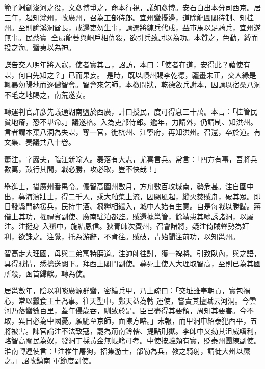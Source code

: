 \begin{pinyinscope}
 範子淵創浚河之役，文彥博爭之，命本行視，議如彥博。安石白出本分司西京。居三年，起知滁州，改廣州，召為工部侍郎。宜州蠻擾邊，道除龍圖閣待制、知桂州。至則諭溪洞酋長，戒邊吏勿生事，請選將練兵代戍，益市馬以足騎兵，宜州遂無事。民蔡寶□全扇龍蕃與峒戶相仇殺，欲引兵致討以為功。本質之，色動，縛而投之海。蠻夷以為神。



 諜告交人明年將入寇，使者實其言，詔訪，本曰：「使者在道，安得此？藉使有謀，何自先知之？」已而果妄。
 是時，既以順州賜李乾德，疆畫未正，交人緣是輒暴勿陽地而逐儂智會。智會來乞師，本檄問狀，乾德斂兵謝本，因請以宿桑八洞不毛之地賜之，南荒遂安。



 轉運判官許彥先議通湖南鹽於西廣，計口授民，度可得息三十萬。本言：「桂管民貧地瘠，恐不堪命。」議遂格。入為吏部侍郎。逾年，力請外，仍請制、知洪州。言者謂本棄八洞為失謀，奪一官，徙杭州、江寧府，再知洪州。召還，卒於道。有文集、奏議共八十卷。



 蕭注，字巖夫，臨江新喻人。磊落有大志，尤喜言兵。常言：「四方有事，吾將兵數萬，鼓行其間，戰必勝，攻必取，豈不快哉！」



 舉進士，攝廣州番禺令。儂智高圍州數月，方舟數百攻城南，勢危甚。注自圍中出，募海濱壯士，得二千人，乘大舶集上流，因颶風起，縱火焚賊舟，破其眾。即日發縣門納援兵，民持牛酒、芻糧相繼入，城中人始有生意。自是每戰以勝歸。蔣偕上其功，擢禮賓副使、廣南駐泊都監。賊還據邕管，餘靖患其嘯誘諸洞，以屬注。注挺身
 入蠻中，施結恩信。狄青師次賓州，召會諸將，疑注倚賊聲勢為奸利，欲誅之。注覺，托為游辭，不肯往。賊破，青始聞注前功，以知邕州。



 智高走大理國，母與二弟寓特磨道。注帥師往討，獲一裨將。引致臥內，與之語，具得賊情，悉擒送闕下。拜西上閣門副使。募死士使入大理取智高，至則已為其國所殺，函首歸獻。轉為使。



 居邕數年，陰以利啖廣源群蠻，密繕兵甲，乃上疏曰：「交址雖奉朝貢，實包禍心，常以蠶食王土為事。往天聖中，鄭天益為轉
 運使，嘗責其擅賦云河洞。今雲河乃落蠻數百里，蓋年侵歲吞，馴致於是。臣已盡得其要領，周知其要害。今不取，異日必為中國憂。願馳至京師，面陳方略。」未報，而甲洞申紹泰犯西平，五將被害。諫官論注不法致寇，罷為荊南鈐轄、提點刑獄。李師中又劾其沮威嗜利，略智高閹民為奴，發洞丁採黃金無帳籍可考。中使按驗頗有實，貶泰州團練副使。淮南轉運使言：「注椎牛屠狗，招集游士，部勒為兵，教之騎射，請徙大州以縻之。」詔改鎮南
 軍節度副使。




\end{pinyinscope}
